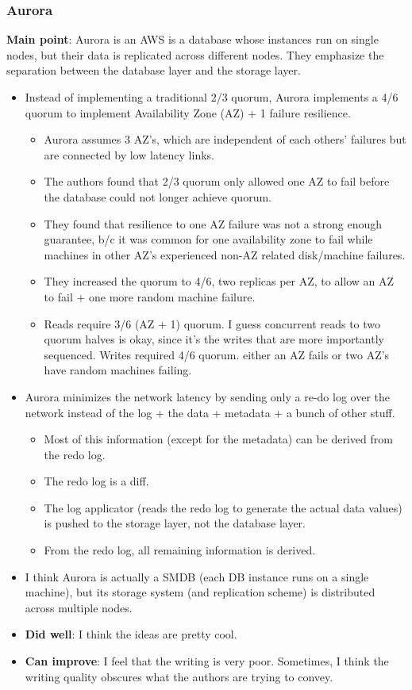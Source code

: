 \subsubsection{Aurora}
\textbf{Main point}: Aurora \cite{aurora} is an AWS is a database whose instances run on single nodes, but their data is replicated across different nodes. They emphasize the separation between the database layer and the storage layer. 
\begin{itemize}
    \item Instead of implementing a traditional 2/3 quorum, Aurora implements a 4/6 quorum to implement Availability Zone (AZ) + 1 failure resilience. 
    \begin{itemize}
        \item Aurora assumes 3 AZ's, which are independent of each others' failures but are connected by low latency links. 
        \item The authors found that 2/3 quorum only allowed one AZ to fail before the database could not longer achieve quorum.
        \item They found that resilience to one AZ failure was not a strong enough guarantee, b/c it was common for one availability zone to fail while machines in other AZ's experienced non-AZ related disk/machine failures.
        \item They increased the quorum to 4/6, two replicas per AZ, to allow an AZ to fail + one more random machine failure.
        \item Reads require 3/6 (AZ + 1) quorum. I guess concurrent reads to two quorum halves is okay, since it's the writes that are more importantly sequenced. Writes required 4/6 quorum. either an AZ fails or two AZ's have random machines failing.
    \end{itemize}
    \item Aurora minimizes the network latency by sending only a re-do log over the network instead of the log + the data + metadata + a bunch of other stuff.
    \begin{itemize}
        \item Most of this information (except for the metadata) can be derived from the redo log.
        \item The redo log is a diff.
        \item The log applicator (reads the redo log to generate the actual data values) is pushed to the storage layer, not the database layer.
        \item From the redo log, all remaining information is derived.
    \end{itemize}
    \item I think Aurora is actually a SMDB (each DB instance runs on a single machine), but its storage system (and replication scheme) is distributed across multiple nodes.
    \item \textbf{Did well}: I think the ideas are pretty cool.
    \item \textbf{Can improve}: I feel that the writing is very poor. Sometimes, I think the writing quality obscures what the authors are trying to convey.
\end{itemize}

